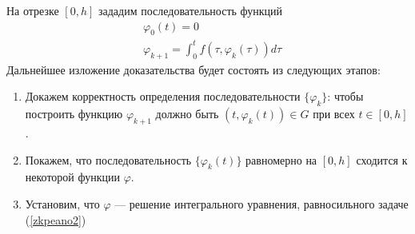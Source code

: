 \documentclass{article}
\begin{document}
На отрезке $[0,h]$ зададим последовательность функций
\begin{equation*}
    \begin{aligned}
        &\varphi_0(t) = 0\\
        &\varphi_{k+1} = \int_0^t f(\tau, \varphi_k(\tau))d\tau
    \end{aligned}
\end{equation*}
Дальнейшее изложение доказательства будет состоять из следующих этапов:
\begin{enumerate}
    \item Докажем корректность определения последовательности $\{\varphi_k\}$: чтобы построить функцию $\varphi_{k+1}$ должно быть $(t, \varphi_k(t)) \in G$ при всех $t \in [0,h]$.
    \item Покажем, что последовательность $\{\varphi_k(t)\}$ равномерно на $[0,h]$ сходится к некоторой функции $\varphi$.
    \item Установим, что $\varphi$ --- решение интегрального уравнения, равносильного задаче (\ref{zkpeano2})
\end{enumerate}
\end{document}
